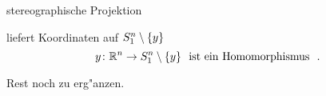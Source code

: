 \documentclass[class=article, crop=false]{standalone}
\begin{document}
\begin{zettel}{stereographische Projektion}
\begin{flashcard}
    \begin{definition}
        liefert Koordinaten auf $S_1^n \setminus \set{y}$ 
\[
    y \from \R^n\to S_1^n \setminus \set{y} \tx{ ist ein Homomorphismus } 
.\]

    \end{definition}

Rest noch zu erg"anzen.

\end{flashcard}
\end{zettel}
\end{document}
